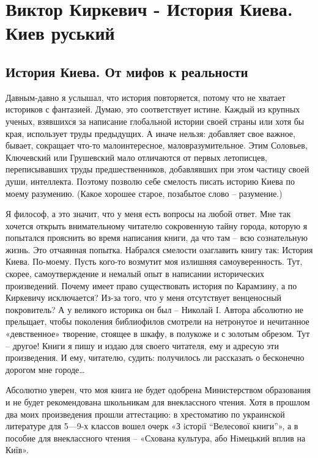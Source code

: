  
 
 
 
 
\chapter{Виктор Киркевич - История Киева. Киев руський}

\section{История Киева. От мифов к реальности}

Давным-давно я услышал, что история повторяется, потому что не хватает
историков с фантазией. Думаю, это соответствует истине. Каждый из крупных
ученых, взявшихся за написание глобальной истории своей страны или хотя бы
края, использует труды предыдущих. А иначе нельзя: добавляет свое важное,
бывает, сокращает что-то малоинтересное, маловразумительное. Этим Соловьев,
Ключевский или Грушевский мало отличаются от первых летописцев, переписывавших
труды предшественников, добавлявших при этом частицу своей души, интеллекта.
Поэтому позволю себе смелость писать историю Киева по моему разумению. (Какое
хорошее старое, позабытое слово – разумение.)

Я философ, а это значит, что у меня есть вопросы на любой ответ. Мне так
хочется открыть внимательному читателю сокровенную тайну города, которую я
попытался прояснить во время написания книги, да что там – всю сознательную
жизнь. Это отчаянная попытка. Набрался смелости озаглавить книгу так: История
Киева. По-моему. Пусть кого-то возмутит моя излишняя самоуверенность. Тут,
скорее, самоутверждение и немалый опыт в написании исторических произведений.
Почему имеет право существовать история по Карамзину, а по Киркевичу
исключается? Из-за того, что у меня отсутствует венценосный покровитель? А у
великого историка он был – Николай I. Автора абсолютно не прельщает, чтобы
поколения библиофилов смотрели на нетронутое и нечитанное «девственное»
творение, стоящее в шкафу, в полукоже и с золотым обрезом. Тут – другое! Книги
я пишу и издаю для своего читателя, ему и адресую эти произведения. И ему,
читателю, судить: получилось ли рассказать о бесконечно дорогом мне городе…

Абсолютно уверен, что моя книга не будет одобрена Министерством образования и
не будет рекомендована школьникам для внеклассного чтения. Хотя в прошлом два
моих произведения прошли аттестацию: в хрестоматию по украинской литературе для
5—9-х классов вошел очерк «З iсторiї “Велесової книги”», а в пособие для
внеклассного чтения – «Схована культура, або Нiмецький вплив на Київ».

